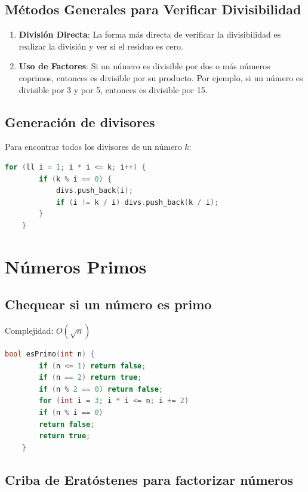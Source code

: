 \subsection{Métodos Generales para Verificar Divisibilidad}

\begin{enumerate}
	\item \textbf{División Directa}: La forma más directa de verificar la divisibilidad es realizar la división y ver si el residuo es cero.
	\item \textbf{Uso de Factores}: Si un número es divisible por dos o más números coprimos, entonces es divisible por su producto. Por ejemplo, si un número es divisible por 3 y por 5, entonces es divisible por 15.
\end{enumerate}

\subsection{Generación de divisores}
Para encontrar todos los divisores de un número $k$:
\begin{lstlisting}[language=C++, caption={Generar los divisores de un numero}]
	for (ll i = 1; i * i <= k; i++) {
		if (k % i == 0) {
			divs.push_back(i);
			if (i != k / i) divs.push_back(k / i);
		}
	}
\end{lstlisting}

\section{Números Primos}

\subsection{Chequear si un número es primo}

Complejidad: \( O(\sqrt{n}) \)
\begin{lstlisting}[language=C++, caption={Chequear si un número es primo}]
	bool esPrimo(int n) {
		if (n <= 1) return false;
		if (n == 2) return true;
		if (n % 2 == 0) return false;
		for (int i = 3; i * i <= n; i += 2)
		if (n % i == 0)
		return false;
		return true;
	}
\end{lstlisting}

\subsection{Criba de Eratóstenes para factorizar números}

